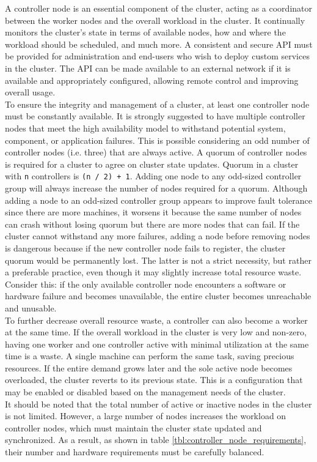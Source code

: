 A controller node is an essential component of the cluster, acting as a coordinator
between the worker nodes and the overall workload in the cluster. It continually
monitors the cluster's state in terms of available nodes, how and where the workload
should be scheduled, and much more. A consistent and secure API must be provided
for administration and end-users who wish to deploy custom services in the cluster.
The API can be made available to an external network if it is available and
appropriately configured, allowing remote control and improving overall usage.
\\ %
To ensure the integrity and management of a cluster, at least one controller
node must be constantly available. It is strongly suggested to have multiple controller
nodes that meet the high availability model to withstand potential system,
component, or application failures. This is possible considering an odd number
of controller nodes (i.e. three) that are always active. A quorum of controller
nodes is required for a cluster to agree on cluster state updates. Quorum in a cluster
with \texttt{n} controllers is \texttt{(n / 2) + 1}. Adding one node to any odd-sized
controller group will always increase the number of nodes required for a quorum.
Although adding a node to an odd-sized controller group appears to improve fault
tolerance since there are more machines, it worsens it because the same number
of nodes can crash without losing quorum but there are more nodes that can fail.
If the cluster cannot withstand any more failures, adding a node before removing
nodes is dangerous because if the new controller node fails to register, the cluster
quorum would be permanently lost\cite{quorum}. The latter is not a strict necessity,
but rather a preferable practice, even though it may slightly increase total resource
waste. Consider this: if the only available controller node encounters a software
or hardware failure and becomes unavailable, the entire cluster becomes
unreachable and unusable.\\ %
To further decrease overall resource waste, a controller can also become a
worker at the same time. If the overall workload in the cluster is very low and non-zero,
having one worker and one controller active with minimal utilization at the same
time is a waste. A single machine can perform the same task, saving precious
resources. If the entire demand grows later and the sole active node becomes overloaded,
the cluster reverts to its previous state. This is a configuration that may be enabled
or disabled based on the management needs of the cluster. \\ %
It should be noted that the total number of active or inactive nodes in the cluster
is not limited. However, a large number of nodes increases the workload on controller
nodes, which must maintain the cluster state updated and synchronized. As a result,
as shown in table \ref{tbl:controller_node_requirements}\cite{k3s_requirements},
their number and hardware requirements must be carefully balanced.

